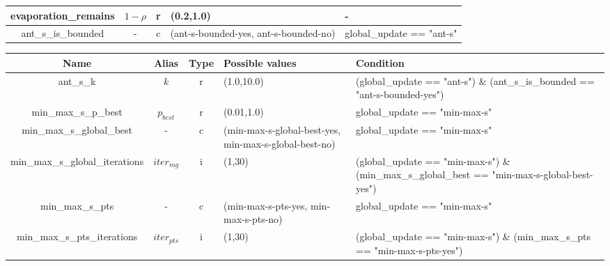 \documentclass[11pt,a4paper,oneside]{book}
\begin{document}
\begin{table}[]
\begin{tabular}{|c|c|c|p{4cm}|p{4cm}|}
evaporation\_remains            & $1-\rho$   & r    & (0.2,1.0)                                                                      & -                                                                                             \\ \hline
ant\_s\_is\_bounded             & -          & c    & (ant-s-bounded-yes, ant-s-bounded-no)                                           & global\_update == "ant-s"                                                                     \\ \hline
\end{tabular}
\end{table}


\begin{table}[]
\centering
\begin{tabular}{|c|c|c|p{4cm}|p{4cm}|}
\hline
\textbf{Name}  & \textbf{Alias}      & \textbf{Type} & \textbf{Possible values}                                                                & \textbf{Condition}                                                                                     \\ \hline
ant\_s\_k                       & $k$        & r    & (1.0,10.0)                                                                     & (global\_update == "ant-s") \& (ant\_s\_is\_bounded == "ant-s-bounded-yes")                   \\ \hline
min\_max\_s\_p\_best            & $p_{best}$ & r    & (0.01,1.0)                                                                     & global\_update == "min-max-s"                                                                 \\ \hline
min\_max\_s\_global\_best       & -          & c    & (min-max-s-global-best-yes, min-max-s-global-best-no)                           & global\_update == "min-max-s"                                                                 \\ \hline
min\_max\_s\_global\_iterations & $iter_{mg}$ & i    & (1,30)                                                                         & (global\_update == "min-max-s") \& (min\_max\_s\_global\_best == "min-max-s-global-best-yes") \\ \hline
min\_max\_s\_pts                & -          & c    & (min-max-s-pts-yes, min-max-s-pts-no)                                           & global\_update == "min-max-s"                                                                 \\ \hline
min\_max\_s\_pts\_iterations    & $iter_{pts}$ & i    & (1,30)                                                                         & (global\_update == "min-max-s") \& (min\_max\_s\_pts == "min-max-s-pts-yes")                  \\ \hline

\end{tabular}
\end{table}
\end{document}
